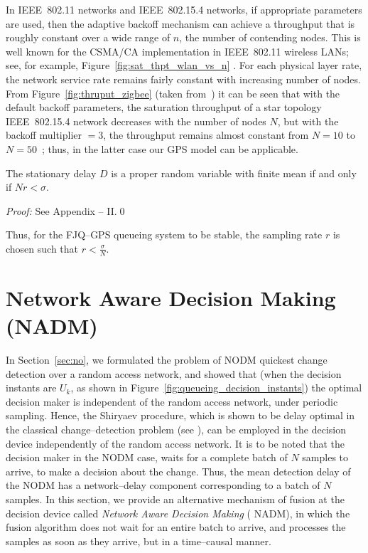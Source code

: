 \documentclass[acmtosn]{acmtrans2m}
\begin{document}
In IEEE~802.11
networks and IEEE~802.15.4 networks, if appropriate parameters are
used, then the adaptive backoff mechanism can achieve a throughput
that is roughly constant over a wide range of $n$, the number of
contending nodes.  This is well known for the CSMA/CA implementation
in IEEE~802.11 wireless LANs; see, for example,
Figure~\ref{fig:sat_thpt_wlan_vs_n} \cite{books.kmk08wireless}. For each physical layer rate, the
network service rate remains fairly constant with increasing number of
nodes.  From Figure~\ref{fig:thruput_zigbee} (taken
from~\cite{chandramani-thesis}) it can be seen that with the default
backoff parameters, the saturation throughput of a star topology
IEEE~802.15.4 network decreases with the number of nodes $N$, but with
the backoff multiplier $=3$, the throughput remains almost constant
from $N=10$ to $N=50$~\cite{chandramani-thesis}; thus, in the latter
case our GPS model can be applicable.



\begin{theorem}
\label{thm:fjq-gps_stationary_delay}
The stationary delay $D$ is a proper random variable with finite
mean if and only if $N r < \sigma$.
 \end{theorem}
\emph{Proof:} See Appendix -- II.\qed

\vspace{1em}
\noindent
Thus, for the FJQ--GPS queueing system to be stable, 
the sampling rate $r$ is chosen such that $r < \frac{\sigma}{N}$. 

\section{Network Aware Decision Making ({\sf NADM})}
\label{sec:na}
In Section~\ref{sec:no}, we formulated the problem of {\sf NODM}
quickest change detection over a random access network, and showed that
(when the decision instants are $U_k$, as shown in
Figure~\ref{fig:queueing_decision_instants}) the optimal decision maker
is independent of the random access network, under periodic sampling.
Hence, the Shiryaev procedure, which is shown to be delay optimal in the
classical change--detection problem (see \cite{shiryayev}), can be
employed in the decision device independently of the random access
network. It is to be noted that the decision maker in the {\sf NODM}
case, waits for a complete batch of $N$ samples to arrive, to make a
decision about the change. Thus, the mean detection delay of the {\sf
NODM} has a network--delay component corresponding to a batch of $N$
samples.  In this section, we provide an alternative mechanism of fusion
at the decision device called {\em Network Aware Decision Making} ({\sf
NADM}), in which the fusion algorithm does not wait for an entire batch
to arrive, and processes the samples as soon as they arrive, but in a
time--causal manner.  
 
\end{document}
